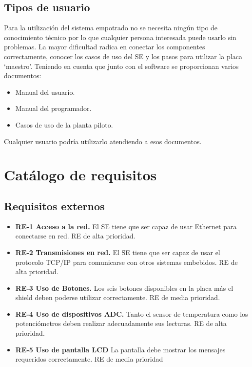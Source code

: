 \subsection{Tipos de usuario}
Para la utilización del sistema empotrado no se necesita ningún tipo de conocimiento técnico por lo que cualquier persona interesada puede usarlo sin problemas. La mayor dificultad radica en conectar los componentes correctamente, conocer los casos de uso del SE y los pasos para utilizar la placa `maestro'. 
Teniendo en cuenta que junto con el software se proporcionan varios documentos:
\begin{itemize}
\item Manual del usuario.
\item Manual del programador.
\item Casos de uso de la planta piloto.
\end{itemize} 
Cualquier usuario podría utilizarlo atendiendo a esos documentos.

\section{Catálogo de requisitos}
\subsection{Requisitos externos}
\begin{itemize}
  	
	\item \textbf{RE-1 Acceso a la red.} El SE tiene que ser capaz de usar Ethernet para conectarse en red. RE de alta prioridad.
	\item \textbf{RE-2 Transmisiones en red.} El SE tiene que ser capaz de usar el protocolo TCP/IP para comunicarse con otros sistemas embebidos. RE de alta prioridad.
	\item \textbf{RE-3 Uso de Botones.} Los seis botones disponibles en la placa más el shield deben poderse utilizar correctamente.  RE de media prioridad.
	\item \textbf{RE-4 Uso de dispositivos ADC.} Tanto el sensor de temperatura como los potenciómetros deben realizar adecuadamente sus lecturas. RE de alta prioridad.
	\item \textbf{RE-5 Uso de pantalla LCD} La pantalla debe mostrar los mensajes requeridos correctamente. RE de media prioridad
	
\end{itemize}

